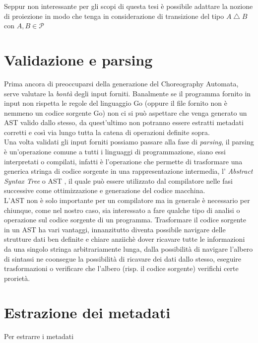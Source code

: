 \begin{remark}
    Seppur non interessante per gli scopi di questa tesi è possibile adattare la nozione di proiezione in modo che tenga in considerazione di transizione del tipo $A \bigtriangleup B$ con $A, B \in \mathcal{P}$
\end{remark}

\section{Validazione e parsing}
Prima ancora di preoccuparsi della generazione del Choreography Automata, serve valutare la \emph{bontà} degli input forniti. Banalmente se il programma fornito in input non rispetta le regole del linguaggio Go (oppure il file fornito non è nemmeno un codice sorgente Go) non ci si può aspettare che venga generato un AST valido dallo stesso, da quest'ultimo non potranno essere estratti metadati corretti e così via lungo tutta la catena di operazioni definite sopra.\\
Una volta validati gli input forniti possiamo passare alla fase di \emph{parsing}, il parsing è un'operazione comune a tutti i linguaggi di programmazione, siano essi interpretati o compilati, infatti è l'operazione che permette di trasformare una generica stringa di codice sorgente in una rappresentazione intermedia, l' \emph{Abstract Syntax Tree} o AST , il quale può essere utilizzato dal compilatore nelle fasi successive come ottimizzazione e generazione del codice macchina.\\
L'AST non è solo importante per un compilatore ma in generale è necessario per chiunque, come nel nostro caso, sia interessato a fare qualche tipo di analisi o operazione sul codice sorgente di un programma. Trasformare il codice sorgente in un AST ha vari vantaggi, innanzitutto diventa possibile navigare delle strutture dati ben definite e chiare anziichè dover ricavare tutte le informazioni da una singolo stringa arbitrariamente lunga, dalla possibilità di navigare l'albero di sintassi ne coonsegue la possibilità di ricavare dei dati dallo stesso, eseguire trasformazioni o verificare che l'albero (risp. il codice sorgente) verifichi certe prorietà.


\section{Estrazione dei metadati}
Per estrarre i metadati

